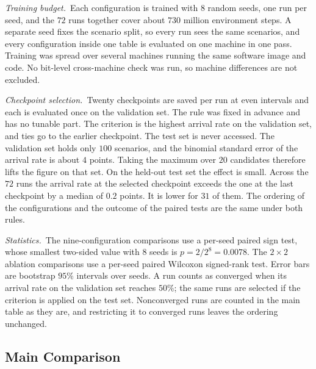 \documentclass[10pt,letterpaper]{article}
\begin{document}
\noindent\textit{Training budget.}\ Each configuration is trained with $8$ random seeds,
one run per seed, and the $72$ runs together cover about $730$ million environment
steps. A separate seed fixes the scenario split, so every run sees the same scenarios,
and every configuration inside one table is evaluated on one machine in one pass.
Training was spread over several machines running the same software image and code.
No bit-level cross-machine check was run, so machine differences are not excluded.

\noindent\textit{Checkpoint selection.}\ Twenty checkpoints are saved per run at even
intervals and each is evaluated once on the validation set. The rule was fixed in advance and has no tunable part. The criterion is the highest
arrival rate on the validation set, and ties go to the earlier checkpoint. The test set
is never accessed. The validation set holds only $100$ scenarios, and the binomial standard error of the
arrival rate is about $4$ points. Taking the maximum over $20$ candidates therefore
lifts the figure on that set. On the held-out test set the
effect is small. Across the $72$ runs the arrival rate at the selected checkpoint exceeds the one at the
last checkpoint by a median of $0.2$ points. It is lower for $31$ of them. The ordering of the configurations and the outcome of the paired tests are
the same under both rules.

\noindent\textit{Statistics.}\ The nine-configuration comparisons use a per-seed paired
sign test, whose smallest two-sided value with $8$ seeds is $p=2/2^{8}=0.0078$. The
$2\times2$ ablation comparisons use a per-seed paired Wilcoxon signed-rank test. Error bars are bootstrap $95\%$ intervals over seeds. A run counts as converged when its
arrival rate on the validation set reaches $50\%$; the same runs are selected if the
criterion is applied on the test set. Nonconverged runs are counted in the main table as
they are, and restricting it to converged runs leaves the ordering unchanged.

\subsection{Main Comparison}
\label{sec:res-main}
\end{document}
